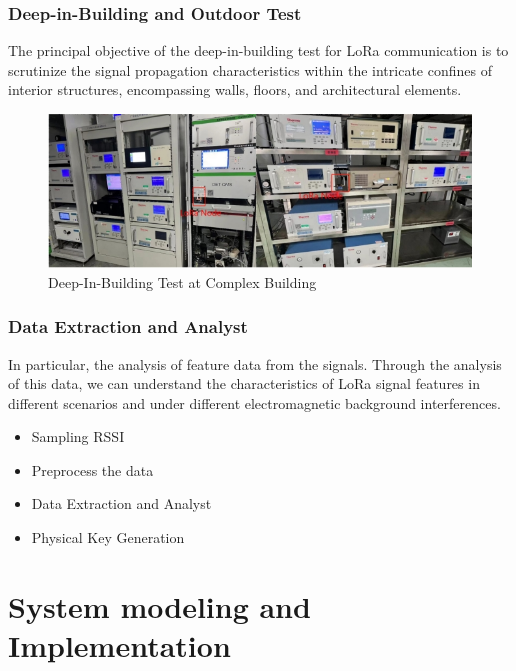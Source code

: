 \documentclass{beamer}
\begin{document}
\begin{frame}
  \frametitle{Deep-in-Building and Outdoor Test}
  The principal objective of the deep-in-building test for LoRa communication is to scrutinize the signal propagation characteristics within the intricate confines of interior structures, encompassing walls, floors, and architectural elements.
  \begin{figure}
    \centering
    \includegraphics[width=0.8\linewidth]{../figures/fig3-5.png}
    \caption{Deep-In-Building Test at Complex Building}
    \label{fig:3-5}
  \end{figure}
\end{frame}

\begin{frame}
  \frametitle{Data Extraction and Analyst}

  In particular, the analysis of feature data from the signals. Through the analysis of this data, we can understand the characteristics of LoRa signal features in different scenarios and under different electromagnetic background interferences.
  \begin{itemize}
    \item Sampling RSSI
    \item Preprocess the data
    \item Data Extraction and Analyst
    \item Physical Key Generation
  \end{itemize}
\end{frame}


\section{System modeling and Implementation}
\end{document}
